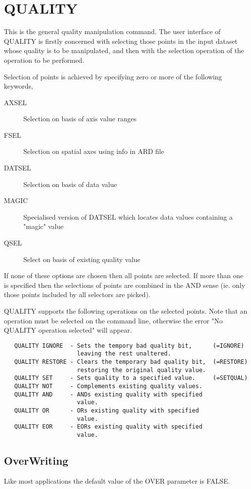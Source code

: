 \documentclass{book}
\renewcommand{\_}{{\tt\char'137}}     %
\begin{document}
\section{QUALITY}
This is the general quality manipulation command. The user interface
of QUALITY is firstly concerned with selecting those points in the
input dataset whose quality is to be manipulated, and then with the
selection operation of the operation to be performed.

Selection of points is achieved by specifying zero or more of the
following keywords,


\begin{description}
\item[AXSEL]
Selection on basis of axis value ranges
\item[FSEL]
Selection on spatial axes using info in ARD file
\item[DATSEL]
Selection on basis of data value
\item[MAGIC]
Specialised version of DATSEL which locates data values
containing a "magic" value
\item[QSEL]
Select on basis of existing quality value
\end{description}
If none of these options are chosen then all points are selected. If
more than one is specified then the selections of points are combined
in the AND sense (ie. only those points included by all selectors are
picked).

QUALITY supports the following operations on the selected points. Note
that an operation must be selected on the command line, otherwise the
error "No QUALITY operation selected" will appear.

\begin{verbatim}
   QUALITY IGNORE  - Sets the tempory bad quality bit,      (=IGNORE)
                     leaving the rest unaltered.
   QUALITY RESTORE - Clears the temporary bad quality bit,  (=RESTORE)
                     restoring the original quality value.
   QUALITY SET     - Sets quality to a specified value.     (=SETQUAL)
   QUALITY NOT     - Complements existing quality values.
   QUALITY AND     - ANDs existing quality with specified
                     value.
   QUALITY OR      - ORs existing quality with specified
                     value.
   QUALITY EOR     - EORs existing quality with specified
                     value.
\end{verbatim}
\subsection{OverWriting}
Like most applications the default value of the OVER
parameter is FALSE.
\end{document}
